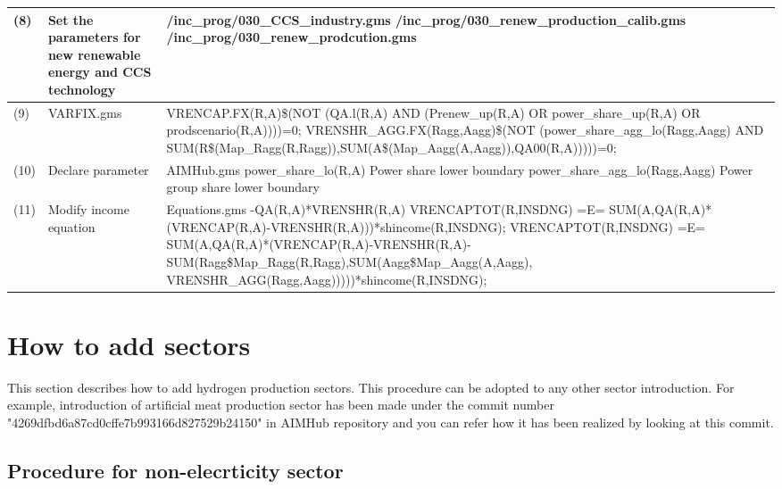 \documentclass[10pt,a4paper,titlepage,dvipdfmx]{book}
\begin{document}
\begin{landscape}
\begin{tabularx}{\textwidth}{|
p{}|
p{}|
p{}|}
(8) & Set the parameters for new renewable energy and CCS technology & /inc\_prog/030\_CCS\_industry.gms \newline /inc\_prog/030\_renew\_production\_calib.gms \newline /inc\_prog/030\_renew\_prodcution.gms \\\hline 
(9) & VARFIX.gms & VRENCAP.FX(R,A)\$(NOT (QA.l(R,A) AND (Prenew\_up(R,A) OR power\_share\_up(R,A) OR prodscenario(R,A))))=0; \newline VRENSHR\_AGG.FX(Ragg,Aagg)\$(NOT (power\_share\_agg\_lo(Ragg,Aagg) AND SUM(R\$(Map\_Ragg(R,Ragg)),SUM(A\$(Map\_Aagg(A,Aagg)),QA00(R,A)))))=0; \\\hline 
(10) & Declare parameter & AIMHub.gms \newline power\_share\_lo(R,A)   Power share lower boundary \newline  power\_share\_agg\_lo(Ragg,Aagg)   Power group share lower boundary \\\hline 
(11) & Modify income equation &  Equations.gms \newline                -QA(R,A)*VRENSHR(R,A) \newline           VRENCAPTOT(R,INSDNG) =E= SUM(A,QA(R,A)*(VRENCAP(R,A)-VRENSHR(R,A)))*shincome(R,INSDNG); \newline     VRENCAPTOT(R,INSDNG) =E= SUM(A,QA(R,A)*(VRENCAP(R,A)-VRENSHR(R,A)-SUM(Ragg\$Map\_Ragg(R,Ragg),SUM(Aagg\$Map\_Aagg(A,Aagg), VRENSHR\_AGG(Ragg,Aagg)))))*shincome(R,INSDNG); \\\hline 
\end{tabularx}
\end{landscape}

\section{\label{sec:HowAddSec}How to add sectors}

This section describes how to add hydrogen production sectors. This procedure can be adopted to any other sector introduction. 
For example, introduction of artificial meat production sector has been made under the commit number  "4269dfbd6a87cd0cffe7b993166d827529b24150"  in AIMHub repository and you can refer how it has been realized by looking at this commit.

\subsection{\label{subsec:ProNonEleSec}Procedure for non-elecrticity sector}
\end{document}
